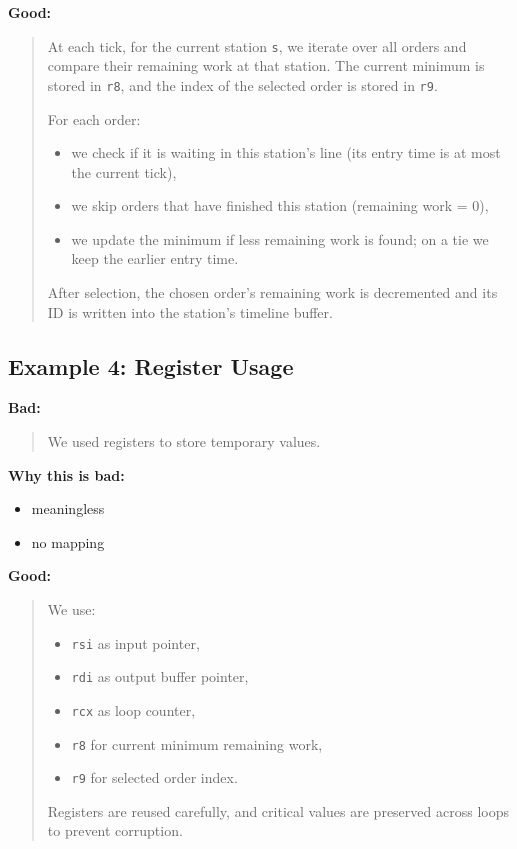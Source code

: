 \documentclass[a4paper,12pt]{article}
\begin{document}
\textbf{Good:}
\begin{quote}
At each tick, for the current station \texttt{s}, we iterate over all orders and compare their remaining work at that station. 
The current minimum is stored in \texttt{r8}, and the index of the selected order is stored in \texttt{r9}. 

For each order:
\begin{itemize}
\item we check if it is waiting in this station's line (its entry time is at most the current tick),
\item we skip orders that have finished this station (remaining work = 0),
\item we update the minimum if less remaining work is found; on a tie we keep the earlier entry time.
\end{itemize}

After selection, the chosen order's remaining work is decremented and its ID is written into the station's timeline buffer. 

\end{quote}

\subsection*{Example 4: Register Usage}

\textbf{Bad:}
\begin{quote}
We used registers to store temporary values.
\end{quote}

\textbf{Why this is bad:}
\begin{itemize}
\item meaningless
\item no mapping
\end{itemize}

\textbf{Good:}
\begin{quote}
We use:
\begin{itemize}
\item \texttt{rsi} as input pointer,
\item \texttt{rdi} as output buffer pointer,
\item \texttt{rcx} as loop counter,
\item \texttt{r8} for current minimum remaining work,
\item \texttt{r9} for selected order index.
\end{itemize}

Registers are reused carefully, and critical values are preserved across loops to prevent corruption.
\end{quote}
\end{document}
